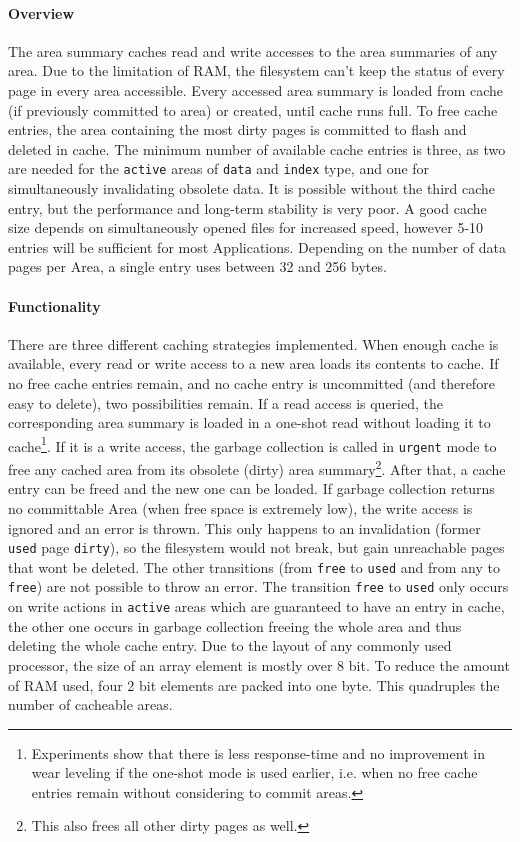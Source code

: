 \paragraph{Overview}
The area summary caches read and write accesses to the area summaries of any area. Due to the limitation of RAM, the filesystem can't keep the status of every page in every area accessible. Every accessed area summary is loaded from cache (if previously committed to area) or created, until cache runs full. To free cache entries, the area containing the most dirty pages is committed to flash and deleted in cache. The minimum number of available cache entries is three, as two are needed for the \texttt{active} areas of \texttt{data} and \texttt{index} type, and one for simultaneously invalidating obsolete data. It is possible without the third cache entry, but the performance and long-term stability is very poor. A good cache size depends on simultaneously opened files for increased speed, however 5-10 entries will be sufficient for most Applications. Depending on the number of data pages per Area, a single entry uses between 32 and 256 bytes.

\paragraph{Functionality}
There are three different caching strategies implemented. When enough cache is available, every read or write access to a new area loads its contents to cache. If no free cache entries remain, and no cache entry is uncommitted (and therefore easy to delete), two possibilities remain. If a read access is queried, the corresponding area summary is loaded in a one-shot read without loading it to cache\footnote{Experiments show that there is less response-time and no improvement in wear leveling if the one-shot mode is used earlier, i.e. when no free cache entries remain without considering to commit areas.}. If it is a write access, the garbage collection is called in \texttt{urgent} mode to free any cached area from its obsolete (dirty) area summary\footnote{This also frees all other dirty pages as well.}. After that, a cache entry can be freed and the new one can be loaded. If garbage collection returns no committable Area (when free space is extremely low), the write access is ignored and an error is thrown. This only happens to an invalidation (former \texttt{used} page \texttt{dirty}), so the filesystem would not break, but gain unreachable pages that wont be deleted. The other transitions (from \texttt{free} to \texttt{used} and from any to \texttt{free}) are not possible to throw an error. The transition \texttt{free} to \texttt{used} only occurs on write actions in \texttt{active} areas which are guaranteed to have an entry in cache, the other one occurs in garbage collection freeing the whole area and thus deleting the whole cache entry.
Due to the layout of any commonly used processor, the size of an array element is mostly over 8 bit. To reduce the amount of RAM used, four 2 bit elements are packed into one byte. This quadruples the number of cacheable areas.

